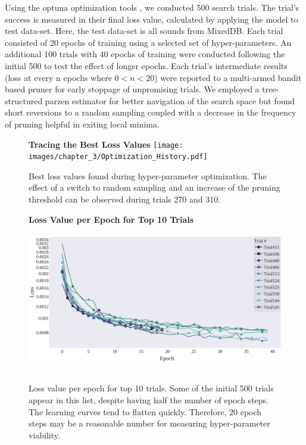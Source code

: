 \documentclass[\main/thesis.tex]{subfiles}
\begin{document}
Using the optuna optimization tools \cite{akiba2019optuna}, we conducted 500 search trials. The trial's success is measured in their final loss value, calculated by applying the model to test data-set. Here, the test data-set is all sounds from MixedDB. Each trial consisted of 20 epochs of training using a selected set of hyper-parameters. An additional 100 trials with 40 epochs of training were conducted following the initial 500 to test the effect of longer epochs. Each trial's intermediate results (loss at every n epochs where $0<n<20$) were reported to a multi-armed bandit based pruner for early stoppage of unpromising trials\cite{li2017hyperband}. We employed a tree-structured parzen estimator for better navigation of the search space \cite{bergstra2011algorithms,akiba2019optuna} but found short reversions to a random sampling coupled with a decrease in the frequency of pruning helpful in exiting local minima. \\
\begin{figure}[htbp]
\centering
\textbf{Tracing the Best Loss Values}
\texttt{[image: images/chapter\_3/Optimization\_History.pdf]}
\caption{Best loss values found during hyper-parameter optimization. The effect of a switch to random sampling and an increase of the pruning threshold can be observed during trials 270 and 310.}
\label{chap3:bestvalues}
\end{figure}

\begin{figure}[]
\centering
\textbf{Loss Value per Epoch for Top 10 Trials}
\includegraphics[width=12cm,height=6.5cm]{images/chapter_3/loss_per_training.pdf}
\caption{Loss value per epoch for top 10 trials. Some of the initial 500 trials appear in this list, despite having half the number of epoch steps. The learning curves tend to flatten quickly. Therefore, 20 epoch steps may be a reasonable number for measuring hyper-parameter viability. }
\label{chap3:top10}
\end{figure}
\end{document}
